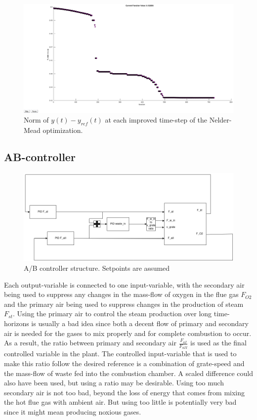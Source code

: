 \begin{figure}[!ht]
    \centering
    \includegraphics[width=\textwidth]{img/autotune_PID_progress.eps}
    \caption{Norm of $y(t) - y_{ref}(t)$ at each improved time-step of the Nelder-Mead optimization.}
    \label{fig:optimization_progress}
\end{figure}


\subsection{AB-controller}


\begin{figure}[!ht]
    \centering
    \includegraphics[width=\textwidth]{img/Fig_dump/AB_controller.png}
    \caption{A/B controller structure. Setpoints are assumed }
    \label{fig:AB_controller_structure}
\end{figure}


\noindent
Each output-variable is connected to one input-variable, with the secondary air being used to suppress any changes in the mass-flow of oxygen in the flue gas $F_{O2}$ and the primary air being used to suppress changes in the production of steam $F_{st}$. Using the primary air to control the steam production over long time-horizons is usually a bad idea since both a decent flow of primary and secondary air is needed for the gases to mix properly and for complete combustion to occur. As a result, the ratio between primary and secondary air $\frac{F_{aI}}{F_{aII}}$ is used as the final controlled variable in the plant. The controlled input-variable that is used to make this ratio follow the desired reference is a combination of grate-speed and the mass-flow of waste fed into the combustion chamber. A scaled difference could also have been used, but using a ratio may be desirable. Using too much secondary air is not too bad, beyond the loss of energy that comes from mixing the hot flue gas with ambient air. But using too little is potentially very bad since it might mean producing noxious gases.

